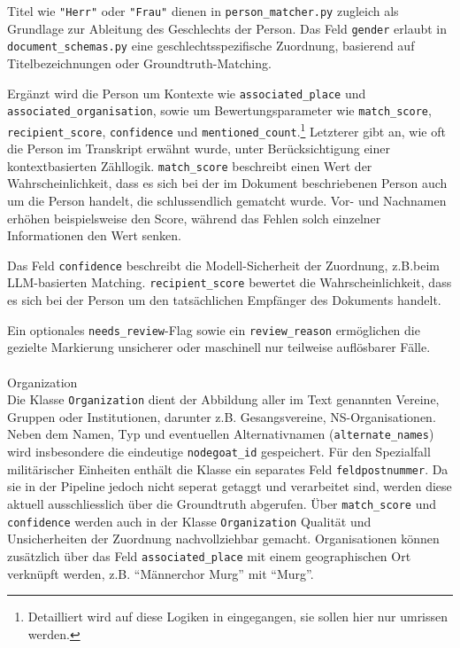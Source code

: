 \documentclass[12pt, a4paper, ngerman, bidi=default]{article}
\makeatletter
\newcommand{\code}[1]{\colorbox{VeryLightGray}{\texttt{#1}}} %
\let\oldparagraph\paragraph%
\renewcommand{\paragraph}{
    \@ifstar%
      \xxxParagraphStar%
      \xxxParagraphNoStar%
 }
\newcommand{\xxxParagraphStar}[1]{\oldparagraph*{#1}\mbox{}}
\newcommand{\xxxParagraphNoStar}[1]{\oldparagraph{#1}\mbox{}}
\makeatother
\begin{document}
Titel wie \code{"Herr"} oder \code{"Frau"} dienen in \code{person\_matcher.py} zugleich als Grundlage zur 
Ableitung des Geschlechts der Person. Das Feld \code{gender} erlaubt in \code{document\_schemas.py} eine 
geschlechtsspezifische Zuordnung, basierend auf Titelbezeichnungen oder Groundtruth-Matching. 

Ergänzt wird die Person um Kontexte wie \code{associated\_place} und \code{associated\_organisation}, sowie um Bewertungsparameter 
wie \code{match\_score}, \code{recipient\_score}, \code{confidence} und \code{mentioned\_count}.\footnote{Detailliert wird auf diese Logiken in 
 eingegangen, sie sollen hier nur umrissen werden.} 
Letzterer gibt an, wie oft 
die Person im Transkript erwähnt wurde, unter Berücksichtigung einer kontextbasierten Zähllogik.
\code{match\_score} beschreibt einen Wert der Wahrscheinlichkeit, dass es sich bei der im Dokument beschriebenen Person auch 
um die Person handelt, die schlussendlich gematcht wurde. Vor- und Nachnamen erhöhen beispielsweise den Score, während das
Fehlen solch einzelner Informationen den Wert senken. 

Das Feld \code{confidence} beschreibt die Modell-Sicherheit der Zuordnung, z.B.beim LLM-basierten Matching. 
\code{recipient\_score} bewertet die Wahrscheinlichkeit, dass es sich bei der Person um den tatsächlichen Empfänger des Dokuments handelt. 

Ein optionales \code{needs\_review}-Flag sowie ein \code{review\_reason} ermöglichen die gezielte Markierung unsicherer oder 
maschinell nur teilweise auflösbarer Fälle.

\paragraph{Organization}\\
Die Klasse \code{Organization} dient der Abbildung aller im Text genannten Vereine, Gruppen oder Institutionen, 
darunter z.B. Gesangsvereine, NS-Organisationen. Neben dem Namen, Typ und eventuellen 
Alternativnamen (\code{alternate\_names}) wird insbesondere die eindeutige \code{nodegoat\_id} gespeichert. Für den Spezialfall 
militärischer Einheiten enthält die Klasse ein separates Feld \code{feldpostnummer}. Da sie in der Pipeline jedoch nicht seperat getaggt und verarbeitet sind,
werden diese aktuell ausschliesslich über die Groundtruth abgerufen. Über \code{match\_score} und \code{confidence} 
werden auch in der Klasse \code{Organization} Qualität und Unsicherheiten der Zuordnung nachvollziehbar gemacht. 
Organisationen können zusätzlich über das Feld \code{associated\_place} mit einem geographischen Ort verknüpft werden, z.B. \enquote{Männerchor Murg} mit \enquote{Murg}.
\end{document}
